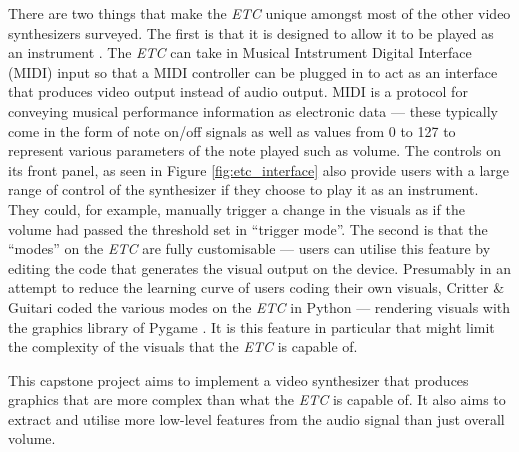 \documentclass[../../initial_thesis.tex]{subfiles}
\begin{document}
There are two things that make the \textit{ETC} unique amongst most of the other video synthesizers surveyed. The first is that it is designed to allow it to be played as an instrument \cite{ETCmanual}. The \textit{ETC} can take in Musical Intstrument Digital Interface (MIDI) input so that a MIDI controller can be plugged in to act as an interface that produces video output instead of audio output. MIDI is a protocol for conveying musical performance information as electronic data \cite{midispecs} --- these typically come in the form of note on/off signals as well as values from 0 to 127 to represent various parameters of the note played such as volume. The controls on its front panel, as seen in Figure \ref{fig:etc_interface} also provide users with a large range of control of the synthesizer if they choose to play it as an instrument. They could, for example, manually trigger a change in the visuals as if the volume had passed the threshold set in ``trigger mode''. The second is that the ``modes'' on the \textit{ETC} are fully customisable --- users can utilise this feature by editing the code that generates the visual output on the device. Presumably in an attempt to reduce the learning curve of users coding their own visuals, Critter \& Guitari coded the various modes on the \textit{ETC} in Python --- rendering visuals with the graphics library of Pygame \cite{ETCmanual}. It is this feature in particular that might limit the complexity of the visuals that the \textit{ETC} is capable of. \par

This capstone project aims to implement a video synthesizer that produces graphics that are more complex than what the \textit{ETC} is capable of. It also aims to extract and utilise more low-level features from the audio signal than just overall volume.
\end{document}

